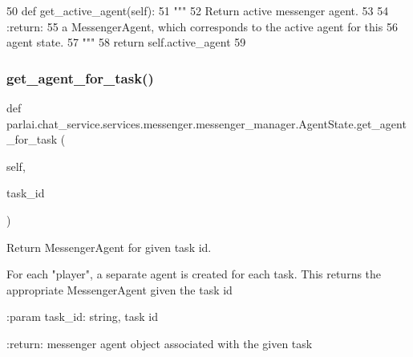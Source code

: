 \begin{DoxyCode}
50     \textcolor{keyword}{def }get\_active\_agent(self):
51         \textcolor{stringliteral}{"""}
52 \textcolor{stringliteral}{        Return active messenger agent.}
53 \textcolor{stringliteral}{}
54 \textcolor{stringliteral}{        :return:}
55 \textcolor{stringliteral}{            a MessengerAgent, which corresponds to the active agent for this}
56 \textcolor{stringliteral}{            agent state.}
57 \textcolor{stringliteral}{        """}
58         \textcolor{keywordflow}{return} self.active\_agent
59 
\end{DoxyCode}
\mbox{\label{classparlai_1_1chat__service_1_1services_1_1messenger_1_1messenger__manager_1_1AgentState_a624cdfd85ad220592fc8d59b72ec3f24}} 
\subsubsection{\texorpdfstring{get\+\_\+agent\+\_\+for\+\_\+task()}{get\_agent\_for\_task()}}
{\footnotesize\ttfamily def parlai.\+chat\+\_\+service.\+services.\+messenger.\+messenger\+\_\+manager.\+Agent\+State.\+get\+\_\+agent\+\_\+for\+\_\+task (\begin{DoxyParamCaption}\item[{}]{self,  }\item[{}]{task\+\_\+id }\end{DoxyParamCaption})}

\begin{DoxyVerb}Return MessengerAgent for given task id.

For each "player", a separate agent is created for each task. This
returns the appropriate MessengerAgent given the task id

:param task_id:
    string, task id

:return:
    messenger agent object associated with the given task
\end{DoxyVerb}
 

